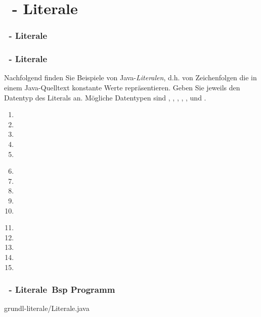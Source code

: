 \def\stitle{\theexercise\ - Literale}
\section{\stitle}
\begin{frame}%
  \frametitle{\stitle}%
\tableofcontents[current]
\end{frame}

\begin{frame}[fragile]%
  \frametitle{\stitle}%


Nachfolgend finden Sie Beispiele von Java-\emph{Literalen}, d.h. von Zeichenfolgen die in einem Java-Quelltext konstante Werte repräsentieren.
Geben Sie jeweils den Datentyp des Literals an.
Mögliche Datentypen sind , , , , ,  und .

\begin{center}

\begin{minipage}{0.3\textwidth}
\begin{enumerate}
\item {}
\item {}
\item {}
\item {}
\item {}
\end{enumerate}
\end{minipage}
\hfill
\begin{minipage}{0.3\textwidth}
\begin{enumerate}
\setcounter{enumi}{5}
\item {}
\item {}
\item {}
\item {}
\item {}
\end{enumerate}
\end{minipage}
\hfill
\begin{minipage}{0.3\textwidth}
\begin{enumerate}
\setcounter{enumi}{10}
\item {}
\item {}
\item {}
\item {}
\item {}
\end{enumerate}
\end{minipage}

\end{center}
\end{frame}


\begin{frame}[t]%
  \frametitle{\stitle\, Bsp Programm}%


{grundl-literale/Literale.java}
\end{frame}